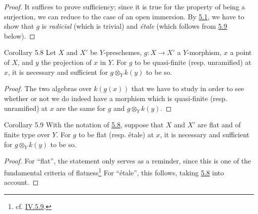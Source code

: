 \begin{proof}
  It suffices to prove sufficiency;
  since it is true for the property of being a surjection, we can reduce to the case of an open immersion.
  By \hyperref[I.5.1]{5.1}, we have to show that $g$ is \emph{radicial} (which is trivial) and \emph{étale} (which follows from \hyperref[I.5.9]{5.9} below).
\end{proof}

\begin{itenv}{Corollary 5.8}
\label{I.5.8}
  Let $X$ and $X'$ be $Y$-preschemes, $g\colon X\to X'$ a $Y$-morphism, $x$ a point of $X$, and $y$ the projection of $x$ in $Y$.
  For $g$ to be quasi-finite (resp. unramified) at $x$, it is necessary and sufficient for $g\otimes_Y k(y)$ to be so.
\end{itenv}

\begin{proof}
  The two algebras over $k(g(x))$ that we have to study in order to see whether or not we do indeed have a morphism which is quasi-finite (resp. unramified) at $x$ are the same for $g$ and $g\otimes_Y k(y)$.
\end{proof}

\begin{itenv}{Corollary 5.9}
\label{I.5.9}
  With the notation of \hyperref[I.5.8]{5.8}, suppose that $X$ and $X'$ are flat and of finite type over $Y$.
  For $g$ to be flat (resp. étale) at $x$, it is necessary and sufficient for $g\otimes_Y k(y)$ to be so.
\end{itenv}

\begin{proof}
  For ``flat'', the statement only serves as a reminder, since this is one of the fundamental criteria of flatness\footnote{cf. \hyperref[IV.5.9]{IV.5.9}.}
  For ``étale'', this follows, taking \hyperref[I.5.8]{5.8} into account.
\end{proof}

